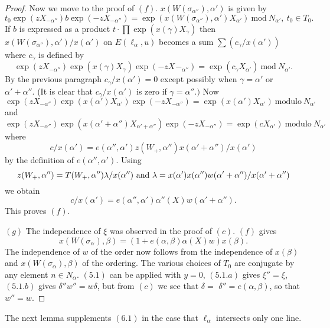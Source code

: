 \documentclass{memo-l}
\theoremstyle{definition}
\theoremstyle{remark}
\numberwithin{section}{chapter}
\numberwithin{equation}{chapter}
\begin{document}
\begin{proof}
   Now we move to the proof of $(f)$.
$x(W({\sigma}_{{\alpha}''}),{\alpha}')$ is given by
$$
t_{0}\exp(zX_{-\alpha''})b\exp(-zX_{-{\alpha}''})  =
\exp(x(W({\sigma}_{{\alpha}''}),{\alpha}')X_{{\alpha'}})\
{\text{mod}}\ N_{{\alpha}'},\ t_{0}  \in  T_{0}.
$$
If $b$ is expressed as a product $t \cdot \prod\exp(x({\gamma})X_{{\gamma}})$ then
$x(W({\sigma}_{{\alpha}''}),{\alpha}')/x({\alpha}')$ on
$E({\ell}_{{\alpha}},u)$ becomes a sum $\sum
(c_{{\gamma}}/x({\alpha}'))$ where $c_{{\gamma}}$ is defined by
$$
\exp(zX_{-{\alpha}''})\exp(x({\gamma})X_{{\gamma}})\exp(-zX_{}-_{{\alpha}''})  =
\exp(c_{{\gamma}}X_{{\alpha}'})\ {\text{mod}}\  N_{{\alpha}'} .
$$
By the previous paragraph $c_{{\gamma}}/x({\alpha}') = 0$ except possibly
when ${\gamma}  =  {\alpha}'$ or ${\alpha}'+{\alpha}''$.  (It is clear that
$c_{{\gamma}}/x({\alpha}')$ is zero if ${\gamma} = {\alpha}''.)$ Now
$$
\exp(zX_{-{\alpha}''})\exp(x({\alpha}')X_{{\alpha}'})\exp(-zX_{-{\alpha}''})  =
\exp(x({\alpha}')X_{{\alpha}'})\ {\text{modulo}}\ N_{{\alpha'}}
$$
and
$$
\exp(zX_{-{\alpha}''})\exp(x({\alpha}'+{\alpha}'')X_{{\alpha}'+{\alpha}''})
\exp(-zX_{-{\alpha}''}) = \exp(cX_{{\alpha}'})\ {\text{modulo}}\ N_{{\alpha'}}
$$
where $$c/x({\alpha}')  =
e({\alpha}'',{\alpha}')z(W_{+},{\alpha}'')x({\alpha}'+{\alpha}'')/x({\alpha}')$$
by the definition of $e({\alpha}'',{\alpha}')$.  Using
$$z(W_{+},{\alpha}'') = T(W_{+},{\alpha}''){\lambda}/x({\alpha}'')\
\hbox {and} \ {\lambda}  =
x({\alpha}')x({\alpha}'')w({\alpha}'+{\alpha}'')/x({\alpha}'+{\alpha}'')$$ we
obtain $$c/x({\alpha}')  =
e({\alpha}'',{\alpha}'){\alpha}''(X)w({\alpha}'+{\alpha}'').$$  This proves $(f)$.


$(g)$ The independence of ${\xi}$ was observed in the proof of $(c)$.
$(f)$ gives $$x(W({\sigma}_{{\alpha}}),{\beta})  =
(1+e({\alpha},{\beta}){\alpha}(X)w)x({\beta}).$$  The independence of $w$ of
the order now follows from the independence of $x({\beta})$ and
$x(W({\sigma}_{{\alpha}}),{\beta})$ of the ordering.  The various choices
of $T_{0}$ are conjugate by any element $n  \in  N_{{\alpha}}$.  $(5.1)$
can be applied with $y  =  0$, $(5.1.a)$ gives ${\xi''}  =  {\xi}$, $(5.1.b)$ gives
${\delta''}w''  =  w{\delta}$, but from $(c)$ we see that ${\delta}  =$  ${\delta}''  =
e({\alpha},{\beta})$, so that $w''  =  w$.
\end{proof}

{\medskip}

The next lemma supplements $(6.1)$ in the case that
${\ell}_{{\alpha}}$ intersects only one line.

\medskip
\end{document}
